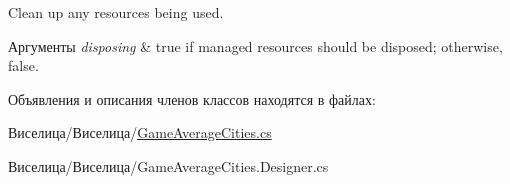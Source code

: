 Clean up any resources being used. 


\begin{DoxyParams}{Аргументы}
{\em disposing} & true if managed resources should be disposed; otherwise, false.\\
\hline
\end{DoxyParams}


Объявления и описания членов классов находятся в файлах\+:\begin{DoxyCompactItemize}
\item 
Виселица/Виселица/\hyperlink{_game_average_cities_8cs}{Game\+Average\+Cities.\+cs}\item 
Виселица/Виселица/Game\+Average\+Cities.\+Designer.\+cs\end{DoxyCompactItemize}
